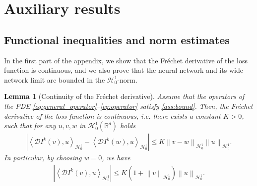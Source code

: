 \documentclass[11pt,a4paper,reqno]{amsart}
\numberwithin{equation}{section}
\theoremstyle{plain}
\newtheorem{lemma}[theorem]{Lemma}
\theoremstyle{definition}
\newcommand{\ip}[1]{\left\langle#1\right\rangle}
\newcommand{\cH}{\mathcal{H}}
\newcommand{\R}{\mathbb{R}}
\newcommand{\D}{\mathcal{D}}
\newcommand{\norm}[1]{\left\|#1 \right\|} %
\newcommand{\abs}[1]{\left|#1\right|} %
\begin{document}

\appendix
\section{Auxiliary results}


\subsection{Functional inequalities and norm estimates}

In the first part of the appendix, we show that the Fréchet derivative of the loss function is continuous, and we also prove that the neural network and its wide network limit are bounded in the $\mathcal H_0^1$-norm.

\begin{lemma}[Continuity of the Fr\'echet derivative] 
\label{lem:con_frechet}
Assume that the operators of the PDE \eqref{eq:general_operator}--\eqref{eq:operator} satisfy \cref{ass:bound}. 
Then, the Fr\'echet derivative of the loss function is continuous, \emph{i.e.} there exists a constant $K > 0$, such that for any $u, v, w$ in $\cH_0^1 (\R^d)$ holds
\begin{align*}
    \abs{\ip{\D I^k \left( v \right), u}_{\cH_0^1} - \ip{\D I^k \left( w \right), u}_{\cH_0^1}} \le K  \norm{v - w}_{\cH_0^1 }  \norm{u}_{\cH_0^1 } .
\end{align*}
In particular, by choosing $w = 0$, we  have
\begin{align*}
    \abs{\ip{\D I^k \left( v \right), u}_{\cH_0^1}} \le K \left(  1 + \norm{v}_{\cH_0^1 } \right)  \norm{u}_{\cH_0^1 } .
\end{align*}
\end{lemma}
\end{document}
